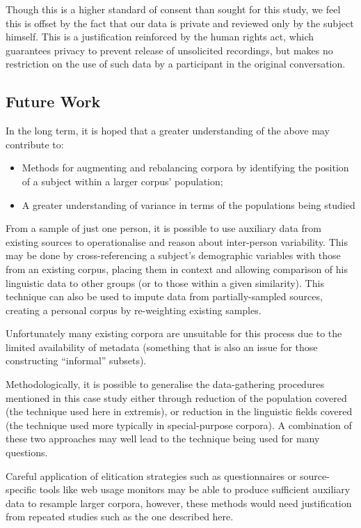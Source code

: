 Though this is a higher standard of consent than sought for this study, we feel this is offset by the fact that our data is private and  reviewed only by the subject himself.  This is a justification reinforced by the human rights act, which guarantees privacy to prevent release of unsolicited recordings, but makes no restriction on the use of such data by a participant in the original conversation.



\subsection{Future Work}

In the long term, it is hoped that a greater understanding of the above may contribute to:

\begin{itemize}
    \item Methods for augmenting and rebalancing corpora by identifying the position of a subject within a larger corpus' population;
    \item A greater understanding of variance in terms of the populations being studied
\end{itemize}

From a sample of just one person, it is possible to use auxiliary data from existing sources to operationalise and reason about inter-person variability.  This may be done by cross-referencing a subject's demographic variables with those from an existing corpus, placing them in context and allowing comparison of his linguistic data to other groups (or to those within a given similarity). This technique can also be used to impute data from partially-sampled sources, creating a personal corpus by re-weighting existing samples.

Unfortunately many existing corpora are unsuitable for this process due to the limited availability of metadata (something that is also an issue for those constructing ``informal'' subsets).

Methodologically, it is possible to generalise the data-gathering procedures mentioned in this case study either through reduction of the population covered (the technique used here in extremis), or reduction in the linguistic fields covered (the technique used more typically in special-purpose corpora).  A combination of these two approaches may well lead to the technique being used for many questions.

Careful application of elitication strategies such as questionnaires or source-specific tools like web usage monitors may be able to produce sufficient auxiliary data to resample larger corpora, however, these methods would need justification from repeated studies such as the one described here.
